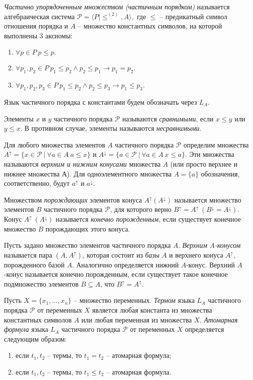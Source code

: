 \documentclass[12pt]{article}
\theoremstyle{break}
\def\P{\mathcal{P}}
\begin{document}
		\textit{Частично упорядоченным множеством (частичным порядком)} называется алгебраическая система $\P = \langle P | \leqslant^{(2)}, A\rangle,$ где $\leqslant$ -- предикатный символ отношения порядка и $A$ -- множество константных символов, на которой выполнены 3 аксиомы:
		\begin{enumerate}
			\item $\forall p\in P\ p\leqslant p.$
			\item $\forall p_1, p_2\in P\ p_1 \leqslant p_2 \wedge p_2 \leqslant p_1 \rightarrow p_1=p_2.$
			\item $\forall p_1, p_2, p_3\in P\ p_1 \leqslant p_2 \wedge p_2 \leqslant p_3 \rightarrow p_1 \leqslant p_3.$
		\end{enumerate}

		Язык частичного порядка с константами будем обозначать через $L_A.$
		
		Элементы $x$ и $y$ частичного порядка $\P$ называются \textit{сравнимыми}, если $x\leqslant y$ или $y\leqslant x.$ В противном случае, элементы называются \textit{несравнимыми}.
	
		Для любого множества элементов $A$ частичного порядка $\P$ определим множества $A^{\uparrow} = \{ x\in\P\ |\ \forall a\in A\ a\leqslant x\}$ и $A^{\downarrow} = \{ a\in\P\ |\ \forall a\in A\ x\leqslant a\}$. Эти множества называются \textit{верхним и нижним конусами} множества $A$ (или просто верхнее и нижнее множества А). Для одноэлементного множества $A=\{a\}$ обозначения, соответственно, будут $a^{\uparrow}$ и $a^{\downarrow}.$

		Множеством \textit{порождающих} элементов конуса $A^{\uparrow}(A^{\downarrow})$ называется множество элементов $B$ частичного порядка $\P$, для которого верно $B^{\uparrow}=A^{\uparrow}~(B^{\downarrow}=A^{\downarrow})$. Конус $A^{\uparrow}~(A^{\downarrow})$ называется \textit{конечно порожденным}, если существует конечное множество $B$ порождающих этого конуса.

		Пусть задано множество элементов частичного порядка $A$. \textit{Верхним A-конусом} называется пара $(A, A^{\uparrow})$, которая состоит из \textit{базы} $A$ и верхнего конуса $A^{\uparrow}$, порожденного базой $A$. Аналогично определяется нижний $A$-конус. Верхний $A$-конус называется конечно порожденным, если существует такое конечное подмножество элементов $B\subseteq A$, что $B^{\uparrow} = A^{\uparrow}$.

		Пусть $X = \{x_1,\dots,x_n\}$ -- множество переменных. \textit{Термом} языка $L_A$ частичного порядка $\P$ от переменных $X$ является любая константа из множества константных символов $A$ или любая переменная из множества $X$. \textit{Атомарная формула} языка $L_A$ частичного порядка $\P$ от переменных $X$ определяется следующим образом:
		\begin{enumerate}
			\item если $t_1, t_2$ -- термы, то $t_1=t_2$ -- атомарная формула;
			\item если $t_1, t_2$ -- термы, то $t_1\leqslant t_2$ -- атомарная формула.
		\end{enumerate}
\end{document}
